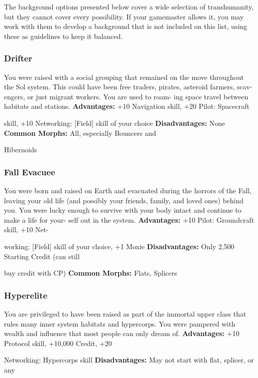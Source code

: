 The background options presented below cover a 
wide selection of transhumanity, but they cannot cover 
every possibility. If your gamemaster allows it, you 
may work with them to develop a background that is 
not included on this list, using these as guidelines to 
keep it balanced.

\subsubsection{Drifter}

You were raised with a social grouping that remained 
on the move throughout the Sol system. This could 
have been free traders, pirates, asteroid farmers, scav-
engers, or just migrant workers. You are used to roam-
ing space travel between habitats and stations.
\textbf{Advantages:} +10 Navigation skill, +20 Pilot: Spacecraft 

skill, +10 Networking: [Field] skill of your choice
\textbf{Disadvantages:} None
\textbf{Common Morphs:} All, especially Bouncers and 

Hibernoids

\subsubsection{Fall Evacuee}

You were born and raised on Earth and evacuated 
during the horrors of the Fall, leaving your old life 
(and possibly your friends, family, and loved ones) 
behind you. You were lucky enough to survive with 
your body intact and continue to make a life for your-
self out in the system.
\textbf{Advantages:  }+10 Pilot: Groundcraft skill, +10 Net-

working: [Field] skill of your choice, +1 Moxie
\textbf{Disadvantages:} Only 2,500 Starting Credit (can still 

buy credit with CP)
\textbf{Common Morphs:} Flats, Splicers

\subsubsection{Hyperelite}

You are privileged to have been raised as part of the 
immortal upper class that rules many inner system 
habitats and hypercorps. You were pampered with 
wealth and influence that most people can only 
dream of.
\textbf{Advantages:} +10 Protocol skill, +10,000 Credit, +20 

Networking: Hypercorps skill
\textbf{Disadvantages:} May not start with flat, splicer, or any 

